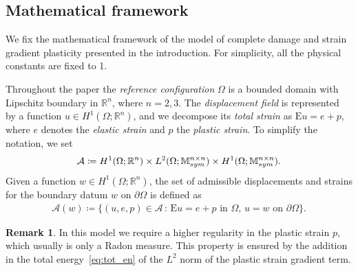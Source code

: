 \documentclass[reqno]{amsart}
\theoremstyle{definition}
\newtheorem{remark}[corollary]{Remark}
\numberwithin{equation}{section}
\def\R {\mathbb R}
\def\M {\mathbb M^{n\times n}_{\rm sym}}
\def\EE {\mathrm{E}}
\begin{document}
\subsection{Mathematical framework}
We fix the mathematical framework of the model of complete damage and strain gradient plasticity presented in the introduction. For simplicity, all the physical constants are fixed to 1.

Throughout the paper the {\it reference configuration} $\Omega$ is a bounded domain with Lipschitz boundary in $\R^n$, where $n=2,3$. The {\it displacement field} is represented by a function $u\in H^1(\Omega;\R^n)$, and we decompose its {\it total strain} as $\EE u=e+p$, where $e$ denotes the {\it elastic strain} and $p$ the {\it plastic strain}. To simplify the notation, we set
$$\mathcal A\coloneqq H^1(\Omega;\R^n)\times L^2(\Omega;\M)\times H^1(\Omega;\M).$$ Given a function $w\in H^1(\Omega;\R^n)$, the set of admissible displacements and strains for the boundary datum $w$ on $\partial\Omega$ is defined as
\begin{align*}
\mathcal A(w)\coloneqq \{(u,e,p)\in \mathcal A\,:\,\text{$\EE u=e+p$ in $\Omega$, $u=w$ on $\partial\Omega$}\}.
\end{align*}

\begin{remark}
In this model we require a higher regularity in the plastic strain $p$, which usually is only a Radon measure. This property is ensured by the addition in the total energy~\eqref{eq:tot_en} of the $L^2$ norm of the plastic strain gradient term.
\end{remark}
\end{document}
